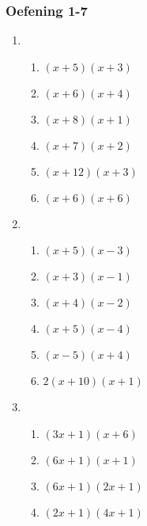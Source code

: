 {\begin{multicols}{3}
\subsubsection*{Oefening 1-7} %

\begin{enumerate}[noitemsep, label=\textbf{\arabic*}. ] 
\item %

\begin{enumerate}[noitemsep, label=\textbf{(\alph*)} ] 
\item $(x + 5)(x + 3)$%
\item $(x + 6)(x + 4)$%
\item $(x + 8)(x + 1)$%
\item $(x + 7)(x + 2)$%
\item $(x + 12)(x + 3)$%
\item $(x + 6)(x + 6)$%
\end{enumerate}



\item %

\begin{enumerate}[noitemsep, label=\textbf{(\alph*)} ]  
\item $(x + 5)(x - 3)$%
\item $(x + 3)(x - 1)$%
\item $(x + 4)(x - 2)$%
\item $(x + 5)(x - 4)$%
\item $(x - 5)(x + 4)$%
\item $2(x + 10)(x + 1)$%
\end{enumerate}



\item %

\begin{enumerate}[noitemsep, label=\textbf{(\alph*)} ] 


\item $(3x + 1)(x + 6)$%
\item $(6x + 1)(x + 1)$%
\item $(6x + 1)(2x + 1)$%
\item $(2x + 1)(4x + 1)$%
\end{enumerate}



\end{enumerate}
\end{multicols}}
